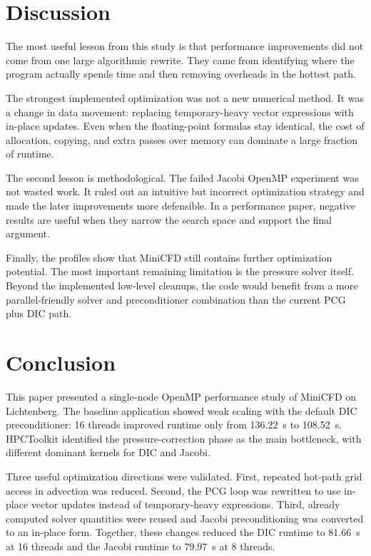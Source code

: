 \documentclass[10pt,firstlineindent,nopartpage,article,accentcolor=tud1b]{tudreport}
\begin{document}
\section{Discussion}
The most useful lesson from this study is that performance improvements did not
come from one large algorithmic rewrite. They came from identifying where the
program actually spends time and then removing overheads in the hottest path.

The strongest implemented optimization was not a new numerical method. It was a
change in data movement: replacing temporary-heavy vector expressions with
in-place updates. Even when the floating-point formulas stay identical, the
cost of allocation, copying, and extra passes over memory can dominate a large
fraction of runtime.

The second lesson is methodological. The failed Jacobi OpenMP experiment was
not wasted work. It ruled out an intuitive but incorrect optimization strategy
and made the later improvements more defensible. In a performance paper,
negative results are useful when they narrow the search space and support the
final argument.

Finally, the profiles show that MiniCFD still contains further optimization
potential. The most important remaining limitation is the pressure solver
itself. Beyond the implemented low-level cleanups, the code would benefit from
a more parallel-friendly solver and preconditioner combination than the current
PCG plus DIC path.

\section{Conclusion}
This paper presented a single-node OpenMP performance study of MiniCFD on
Lichtenberg. The baseline application showed weak scaling with the default DIC
preconditioner: 16 threads improved runtime only from \SI{136.22}{s} to
\SI{108.52}{s}. HPCToolkit identified the pressure-correction phase as the main
bottleneck, with different dominant kernels for DIC and Jacobi.

Three useful optimization directions were validated. First, repeated hot-path
grid access in advection was reduced. Second, the PCG loop was rewritten to use
in-place vector updates instead of temporary-heavy expressions. Third, already
computed solver quantities were reused and Jacobi preconditioning was converted
to an in-place form. Together, these changes reduced the DIC runtime to
\SI{81.66}{s} at 16 threads and the Jacobi runtime to \SI{79.97}{s} at 8
threads.
\end{document}

